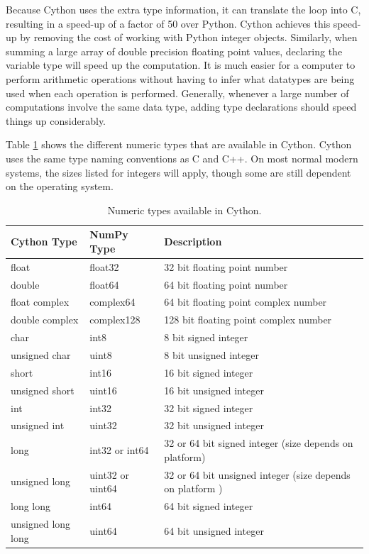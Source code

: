 Because Cython uses the extra type information, it can translate the loop into C, resulting in a speed-up of a factor of 50 over Python.
Cython achieves this speed-up by removing the cost of working with Python integer objects.
Similarly, when summing a large array of double precision floating point values, declaring the variable type will speed up the computation.
It is much easier for a computer to perform arithmetic operations without having to infer what datatypes are being used when each operation is performed.
Generally, whenever a large number of computations involve the same data type, adding type declarations should speed things up considerably.

Table \ref{table:cython_types} shows the different numeric types that are available in Cython.
Cython uses the same type naming conventions as C and C++.
On most normal modern systems, the sizes listed for integers will apply, though some are still dependent on the operating system.

\begin{table}
\begin{center}
\begin{tabular}{|p{2.8cm}|p{2.5cm}|p{6cm}|}
\hline
Cython Type & NumPy Type& Description \\
\hline
float & float32 & 32 bit floating point number \\
double & float64 & 64 bit floating point number \\
float complex & complex64 & 64 bit floating point complex number \\
double complex & complex128 & 128 bit floating point complex number \\
char & int8 & 8 bit signed integer \\
unsigned char & uint8 & 8 bit unsigned integer \\
short & int16 & 16 bit signed integer \\
unsigned short & uint16 & 16 bit unsigned integer \\
int & int32 & 32 bit signed integer \\
unsigned int & uint32 & 32 bit unsigned integer \\
long & int32 or int64 & 32 or 64 bit signed integer (size depends on platform) \\
unsigned long & uint32 or uint64 & 32 or 64 bit unsigned integer (size depends on platform ) \\
long long & int64 & 64 bit signed integer \\
unsigned long long & uint64 & 64 bit unsigned integer \\
\hline
\end{tabular}
\end{center}
\caption{Numeric types available in Cython.}
\label{table:cython_types}
\end{table}


